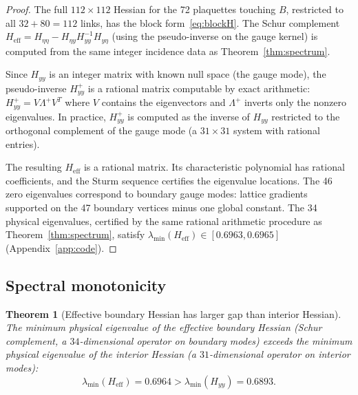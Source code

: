\documentclass[11pt]{article}
\newtheorem{theorem}{Theorem}[section]
\theoremstyle{definition}
\begin{document}
\begin{proof}
The full $112\times 112$ Hessian for the 72 plaquettes touching $B$,
restricted to all $32+80=112$ links, has the block form~\eqref{eq:blockH}.
The Schur complement $H_{\mathrm{eff}}=H_{\eta\eta}
-H_{\eta y}H_{yy}^{-1}H_{y\eta}$ (using the pseudo-inverse on the
gauge kernel) is computed from the same integer incidence data as
Theorem~\ref{thm:spectrum}.

Since $H_{yy}$ is an integer matrix with known null space (the gauge
mode), the pseudo-inverse $H_{yy}^+$ is a rational matrix computable
by exact arithmetic: $H_{yy}^+=V\Lambda^+V^T$ where $V$ contains
the eigenvectors and $\Lambda^+$ inverts only the nonzero eigenvalues.
In practice, $H_{yy}^+$ is computed as the inverse of $H_{yy}$
restricted to the orthogonal complement of the gauge mode (a
$31\times 31$ system with rational entries).

The resulting $H_{\mathrm{eff}}$ is a rational matrix.  Its
characteristic polynomial has rational coefficients, and the Sturm
sequence certifies the eigenvalue locations.  The 46 zero eigenvalues
correspond to boundary gauge modes: lattice gradients supported on
the 47 boundary vertices minus one global constant.  The 34 physical
eigenvalues, certified by the same rational arithmetic procedure as
Theorem~\ref{thm:spectrum}, satisfy $\lambda_{\min}(H_{\mathrm{eff}})
\in[0.6963,0.6965]$ (Appendix~\ref{app:code}).
\end{proof}

\subsection{Spectral monotonicity}

\begin{theorem}[Effective boundary Hessian has larger gap than
interior Hessian]\label{thm:monotone}
The minimum physical eigenvalue of the effective boundary Hessian
(Schur complement, a $34$-dimensional operator on boundary modes)
exceeds the minimum physical eigenvalue of the interior Hessian
(a $31$-dimensional operator on interior modes):
\begin{equation}\label{eq:monotone}
\lambda_{\min}(H_{\mathrm{eff}})=0.6964
>\lambda_{\min}(H_{yy})=0.6893.
\end{equation}
\end{theorem}
\end{document}

